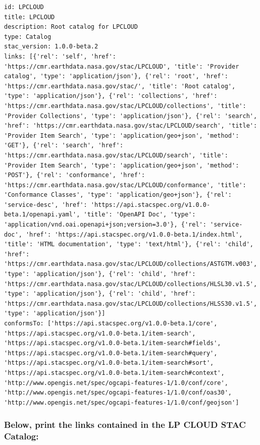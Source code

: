 \documentclass[
  letterpaper,
]{scrartcl}
\begin{document}
\begin{verbatim}
id: LPCLOUD
title: LPCLOUD
description: Root catalog for LPCLOUD
type: Catalog
stac_version: 1.0.0-beta.2
links: [{'rel': 'self', 'href': 'https://cmr.earthdata.nasa.gov/stac/LPCLOUD', 'title': 'Provider catalog', 'type': 'application/json'}, {'rel': 'root', 'href': 'https://cmr.earthdata.nasa.gov/stac/', 'title': 'Root catalog', 'type': 'application/json'}, {'rel': 'collections', 'href': 'https://cmr.earthdata.nasa.gov/stac/LPCLOUD/collections', 'title': 'Provider Collections', 'type': 'application/json'}, {'rel': 'search', 'href': 'https://cmr.earthdata.nasa.gov/stac/LPCLOUD/search', 'title': 'Provider Item Search', 'type': 'application/geo+json', 'method': 'GET'}, {'rel': 'search', 'href': 'https://cmr.earthdata.nasa.gov/stac/LPCLOUD/search', 'title': 'Provider Item Search', 'type': 'application/geo+json', 'method': 'POST'}, {'rel': 'conformance', 'href': 'https://cmr.earthdata.nasa.gov/stac/LPCLOUD/conformance', 'title': 'Conformance Classes', 'type': 'application/geo+json'}, {'rel': 'service-desc', 'href': 'https://api.stacspec.org/v1.0.0-beta.1/openapi.yaml', 'title': 'OpenAPI Doc', 'type': 'application/vnd.oai.openapi+json;version=3.0'}, {'rel': 'service-doc', 'href': 'https://api.stacspec.org/v1.0.0-beta.1/index.html', 'title': 'HTML documentation', 'type': 'text/html'}, {'rel': 'child', 'href': 'https://cmr.earthdata.nasa.gov/stac/LPCLOUD/collections/ASTGTM.v003', 'type': 'application/json'}, {'rel': 'child', 'href': 'https://cmr.earthdata.nasa.gov/stac/LPCLOUD/collections/HLSL30.v1.5', 'type': 'application/json'}, {'rel': 'child', 'href': 'https://cmr.earthdata.nasa.gov/stac/LPCLOUD/collections/HLSS30.v1.5', 'type': 'application/json'}]
conformsTo: ['https://api.stacspec.org/v1.0.0-beta.1/core', 'https://api.stacspec.org/v1.0.0-beta.1/item-search', 'https://api.stacspec.org/v1.0.0-beta.1/item-search#fields', 'https://api.stacspec.org/v1.0.0-beta.1/item-search#query', 'https://api.stacspec.org/v1.0.0-beta.1/item-search#sort', 'https://api.stacspec.org/v1.0.0-beta.1/item-search#context', 'http://www.opengis.net/spec/ogcapi-features-1/1.0/conf/core', 'http://www.opengis.net/spec/ogcapi-features-1/1.0/conf/oas30', 'http://www.opengis.net/spec/ogcapi-features-1/1.0/conf/geojson']
\end{verbatim}

\hypertarget{below-print-the-links-contained-in-the-lp-cloud-stac-catalog}{%
\subsubsection{Below, print the links contained in the LP CLOUD STAC
Catalog:}\label{below-print-the-links-contained-in-the-lp-cloud-stac-catalog}}
\end{document}
